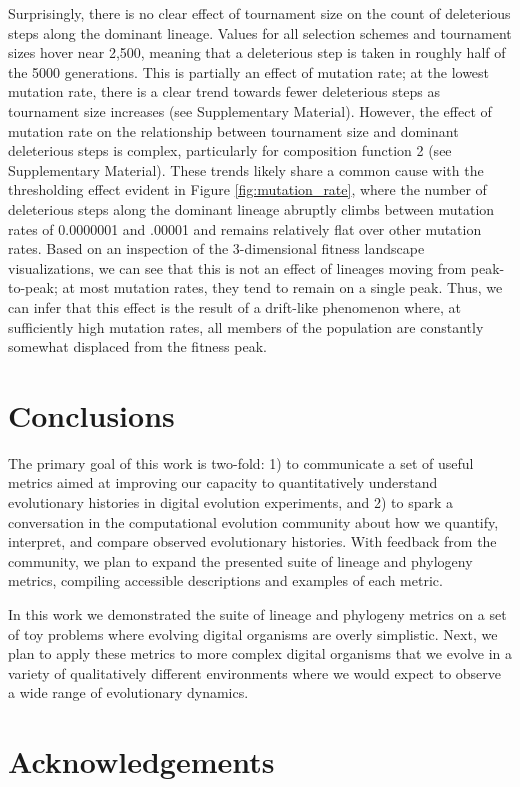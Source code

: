 \documentclass[letterpaper]{article}
\begin{document}
Surprisingly, there is no clear effect of tournament size on the count of deleterious steps along the dominant lineage. Values for all selection schemes and tournament sizes hover near 2,500, meaning that a deleterious step is taken in roughly half of the 5000 generations. This is partially an effect of mutation rate; at the lowest mutation rate, there is a clear trend towards fewer deleterious steps as tournament size increases (see Supplementary Material). However, the effect of mutation rate on the relationship between tournament size and dominant deleterious steps is complex, particularly for composition function 2 (see Supplementary Material). These trends likely share a common cause with the thresholding effect evident in Figure \ref{fig:mutation_rate}, where the number of deleterious steps along the dominant lineage abruptly climbs between mutation rates of 0.0000001 and .00001 and remains relatively flat over other mutation rates. Based on an inspection of the 3-dimensional fitness landscape visualizations, we can see that this is not an effect of lineages moving from peak-to-peak; at most mutation rates, they tend to remain on a single peak. Thus, we can infer that this effect is the result of a drift-like phenomenon where, at sufficiently high mutation rates, all members of the population are constantly somewhat displaced from the fitness peak.


\section{Conclusions}


The primary goal of this work is two-fold: 1) to communicate a set of useful metrics aimed at improving our capacity to quantitatively understand evolutionary histories in digital evolution experiments, and 2) to spark a conversation in the computational evolution community about how we quantify, interpret, and compare observed evolutionary histories. With feedback from the community, we plan to expand the presented suite of lineage and phylogeny metrics, compiling accessible descriptions and examples of each metric. 

In this work we demonstrated the suite of lineage and phylogeny metrics on a set of toy problems where evolving digital organisms are overly simplistic. Next, we plan to apply these metrics to more complex digital organisms that we evolve in a variety of qualitatively different environments where we would expect to observe a wide range of evolutionary dynamics. 

\section{Acknowledgements}

\setlength{\bibsep}{2pt}

\footnotesize

\end{document}
